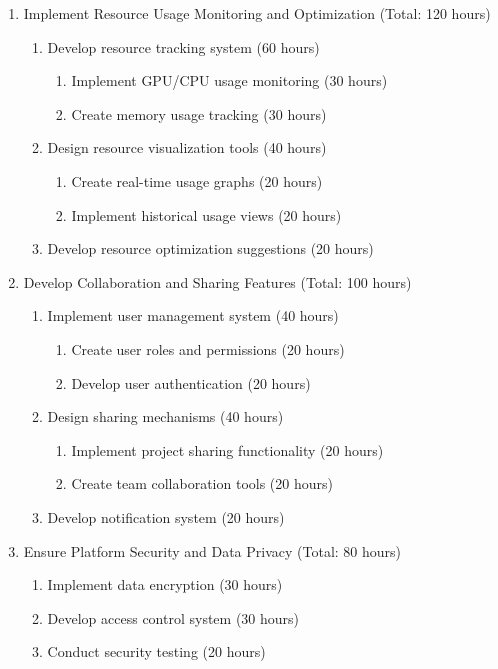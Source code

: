 \documentclass[12pt]{article}
\begin{document}
\begin{enumerate}
    \item Implement Resource Usage Monitoring and Optimization (Total: 120 hours)
    \begin{enumerate}
        \item Develop resource tracking system (60 hours)
        \begin{enumerate}
            \item Implement GPU/CPU usage monitoring (30 hours)
            \item Create memory usage tracking (30 hours)
        \end{enumerate}
        \item Design resource visualization tools (40 hours)
        \begin{enumerate}
            \item Create real-time usage graphs (20 hours)
            \item Implement historical usage views (20 hours)
        \end{enumerate}
        \item Develop resource optimization suggestions (20 hours)
    \end{enumerate}

    \item Develop Collaboration and Sharing Features (Total: 100 hours)
    \begin{enumerate}
        \item Implement user management system (40 hours)
        \begin{enumerate}
            \item Create user roles and permissions (20 hours)
            \item Develop user authentication (20 hours)
        \end{enumerate}
        \item Design sharing mechanisms (40 hours)
        \begin{enumerate}
            \item Implement project sharing functionality (20 hours)
            \item Create team collaboration tools (20 hours)
        \end{enumerate}
        \item Develop notification system (20 hours)
    \end{enumerate}

    \item Ensure Platform Security and Data Privacy (Total: 80 hours)
    \begin{enumerate}
        \item Implement data encryption (30 hours)
        \item Develop access control system (30 hours)
        \item Conduct security testing (20 hours)
    \end{enumerate}


\end{enumerate}
\end{document}
